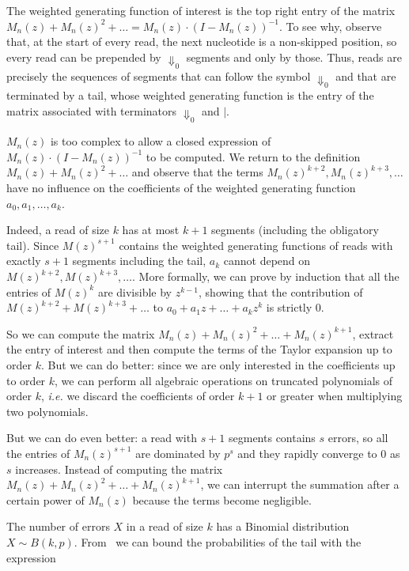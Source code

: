 \documentclass{article}
\begin{document}
The weighted generating function of interest is the top right entry of the
matrix $M_n(z) + M_n(z)^2 + \ldots = M_n(z)\cdot(I-M_n(z))^{-1}$. To see
why, observe that, at the start of every read, the next nucleotide is a
non-skipped position, so every read can be prepended by $\Downarrow_0$
segments and only by those. Thus, reads are precisely the sequences of
segments that can follow the symbol $\Downarrow_0$ and that are terminated
by a tail, whose weighted generating function is the entry of the matrix
associated with terminators $\Downarrow_0$ and $|$.

$M_n(z)$ is too complex to allow a closed expression of $M_n(z) \cdot
(I-M_n(z))^{-1}$ to be computed. We return to the definition $M_n(z) +
M_n(z)^2 + \ldots$ and observe that the terms $M_n(z)^{k+2}, M_n(z)^{k+3},
\ldots$ have no influence on the coefficients of the weighted generating
function $a_0, a_1, \ldots, a_k$.

Indeed, a read of size $k$ has at most $k+1$ segments (including the
obligatory tail). Since $M(z)^{s+1}$ contains the weighted generating
functions of reads with exactly $s+1$ segments including the tail, $a_k$
cannot depend on $M(z)^{k+2}, M(z)^{k+3}, \ldots$. More formally, we can
prove by induction that all the entries of $M(z)^k$ are divisible by
$z^{k-1}$, showing that the contribution of $M(z)^{k+2} + M(z)^{k+3} +
\ldots$ to $a_0 + a_1z + \ldots +a_kz^k$ is strictly $0$.

So we can compute the matrix $M_n(z) + M_n(z)^2 + \ldots + M_n(z)^{k+1}$,
extract the entry of interest and then compute the terms of the Taylor
expansion up to order $k$. But we can do better: since we are only
interested in the coefficients up to order $k$, we can perform all
algebraic operations on truncated polynomials of order $k$, \textit{i.e.}
we discard the coefficients of order $k+1$ or greater when multiplying two
polynomials.

But we can do even better: a read with $s+1$ segments contains $s$ errors,
so all the entries of $M_n(z)^{s+1}$ are dominated by $p^s$ and they
rapidly converge to $0$ as $s$ increases. Instead of computing the matrix
$M_n(z) + M_n(z)^2 + \ldots + M_n(z)^{k+1}$, we can interrupt the
summation after a certain power of $M_n(z)$ because the terms become
negligible.

The number of errors $X$ in a read of size $k$ has a Binomial
distribution $X \sim B(k,p)$. From~\cite{arratia1989tutorial} we can bound
the probabilities of the tail with the expression
\end{document}
